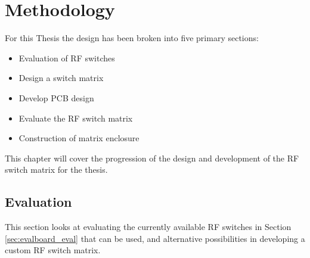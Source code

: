 \documentclass[12pt,openany,a4paper]{book}
\begin{document}
\chapter{Methodology}
For this Thesis the design has been broken into five primary sections:\\[-0.8cm]
\begin{itemize}
	\setlength\itemsep{-0.5em}
	\item Evaluation of RF switches
	\item Design a switch matrix
	\item Develop PCB design
	\item Evaluate the RF switch matrix
	\item Construction of matrix enclosure
\end{itemize}
This chapter will cover the progression of the design and development of the RF switch matrix for the thesis.




\section{Evaluation}
This section looks at evaluating the currently available RF switches in Section \ref{sec:evalboard_eval} that can be used, and alternative possibilities in developing a custom RF switch matrix.\\
\end{document}
